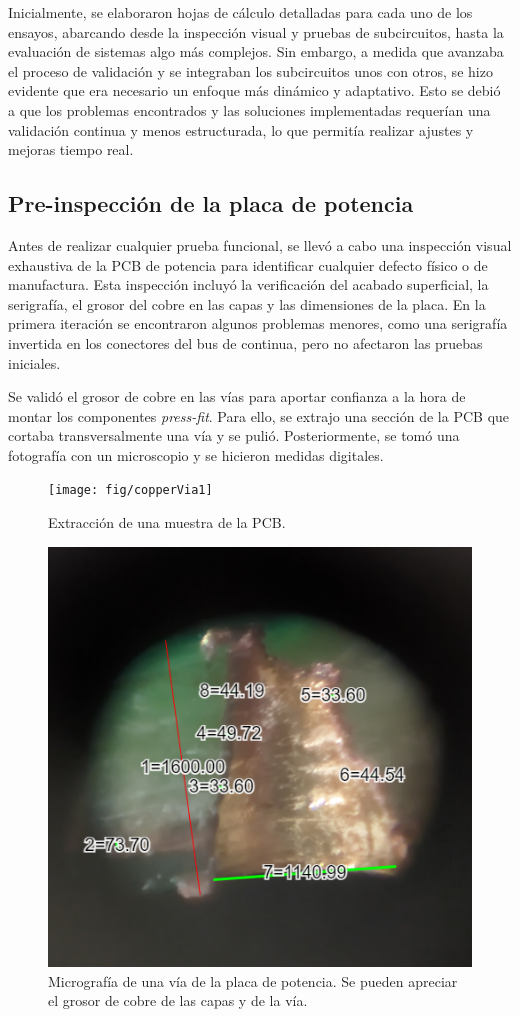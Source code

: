 Inicialmente, se elaboraron hojas de cálculo detalladas para cada uno de los ensayos, abarcando desde la inspección visual y pruebas de subcircuitos, hasta la evaluación de sistemas algo más complejos. Sin embargo, a medida que avanzaba el proceso de validación y se integraban los subcircuitos unos con otros, se hizo evidente que era necesario un enfoque más dinámico y adaptativo. Esto se debió a que los problemas encontrados y las soluciones implementadas requerían una validación continua y menos estructurada, lo que permitía realizar ajustes y mejoras tiempo real.


\subsection{Pre-inspección de la placa de potencia}
Antes de realizar cualquier prueba funcional, se llevó a cabo una inspección visual exhaustiva de la PCB de potencia para identificar cualquier defecto físico o de manufactura. Esta inspección incluyó la verificación del acabado superficial, la serigrafía, el grosor del cobre en las capas y las dimensiones de la placa. En la primera iteración se encontraron algunos problemas menores, como una serigrafía invertida en los conectores del bus de continua, pero no afectaron las pruebas iniciales.

Se validó el grosor de cobre en las vías para aportar confianza a la hora de montar los componentes \textit{press-fit}. Para ello, se extrajo una sección de la PCB que cortaba transversalmente una vía y se pulió. Posteriormente, se tomó una fotografía con un microscopio y se hicieron medidas digitales.

\begin{figure}[H]
	\centering
	\texttt{[image: fig/copperVia1]}
	\caption{Extracción de una muestra de la PCB.}
\end{figure}


\begin{figure}[H]
	\centering
	\includegraphics[width=0.7\linewidth]{fig/copperVia}
	\caption{Micrografía de una vía de la placa de potencia. Se pueden apreciar el grosor de cobre de las capas y de la vía.}
\end{figure}

